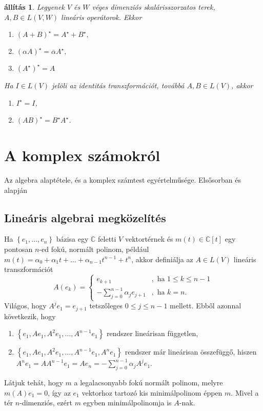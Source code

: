 \documentclass[9pt, a4paper, showtrims]{memoir}
\theoremstyle{plain}
\newtheorem{proposition}{állítás}[chapter]
\theoremstyle{remark}
\theoremstyle{definition}
\begin{document}
\begin{proposition}
    Legyenek $V$ és $W$ véges dimenziós skalárisszorzatos terek, $A,B\in L\left( V,W \right)$ lineáris operátorok.
    Ekkor
    \begin{enumerate}
        \item $\left( A+B \right)^\star=A^\star+B^\star,$
        \item $\left( \alpha A \right)^\star=\overline\alpha A^\star,$
        \item $(A^\star)^\star=A$
    \end{enumerate}
    Ha $I\in L\left( V \right)$ jelöli az identitás transzformációt, továbbá $A,B\in L\left( V \right)$, akkor
    \begin{enumerate}
        \item $I^\star=I$,
        \item $\left( AB \right)^\star=B^\star A^\star$.
    \end{enumerate}
\end{proposition}


\appendix
\renewcommand{\appendixpagename}{Függelékek}\renewcommand{\appendixtocname}{\appendixpagename}
\appendixpage
\chapter{A komplex számokról}
Az algebra alaptétele, és a komplex számtest egyértelműsége. Elsősorban \parencite{MR1415833} és \parencite{10.2307/3647746} alapján
\section{Lineáris algebrai megközelítés}
Ha $\left\{ e_1,\dots,e_n \right\}$ bázisa egy $\mathbb{C}$ feletti $V$ vektortérnek
és $m\left( t \right)\in\mathbb{C}\left[ t \right]$ egy pontosan $n$-ed fokú, 
normált polinom,
például
$m\left( t \right)=\alpha_0+\alpha_1 t+\dots+\alpha_{n-1}t^{n-1}+t^{n}$,
akkor definiálja az $A\in L\left( V \right)$ lineáris transzformációt
\[
    A\left( e_k \right)=
    \begin{cases}
        e_{k+1}&, \text{ ha } 1\leq k \leq n-1\\
        -\sum_{j=0}^{n-1}\alpha_j e_{j+1}&, \text{ ha } k=n.
    \end{cases}
\]
Világos, hogy $A^je_1=e_{j+1}$ tetszőleges $0\leq j\leq n-1$ mellett.
Ebből azonnal következik, hogy 
\begin{enumerate}
    \item 
        $\left\{ e_1, Ae_1,A^2e_1,\dots,A^{n-1}e_1\right\}$ rendszer lineárisan független,
    \item
        $\left\{ e_1, Ae_1,A^2e_1,\dots,A^{n-1}e_1,A^ne_1\right\}$ rendszer már lineárisan összefüggő,
        hiszen
        $A^ne_1=AA^{n-1}e_1=Ae_n=-\sum_{j=0}^{n-1}\alpha_j A^je_1$.
\end{enumerate}
Látjuk tehát, hogy $m$ a legalacsonyabb fokú normált polinom, melyre
$m\left( A \right)e_1=0$,
így az $e_1$ vektorhoz tartozó kis minimálpolinom éppen $m$.
Mivel a tér $n$-dimenziós, ezért $m$ egyben minimálpolinomja is $A$-nak.
\end{document}
